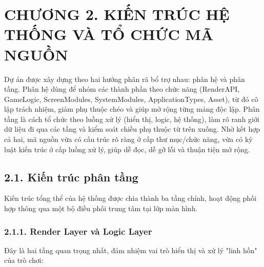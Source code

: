 \chapter*{\centering CHƯƠNG 2. KIẾN TRÚC HỆ THỐNG VÀ TỔ CHỨC MÃ NGUỒN}

\noindent \indent Dự án được xây dựng theo hai hướng phân rã bổ trợ nhau: phân hệ và phân tầng. Phân hệ dùng để nhóm các thành phần theo chức năng (RenderAPI, GameLogic, ScreenModules, SystemModules, ApplicationTypes, Asset), từ đó cô lập trách nhiệm, giảm phụ thuộc chéo và giúp mở rộng từng mảng độc lập. Phân tầng là cách tổ chức theo luồng xử lý (hiển thị, logic, hệ thống), làm rõ ranh giới dữ liệu đi qua các tầng và kiểm soát chiều phụ thuộc từ trên xuống. Nhờ kết hợp cả hai, mã nguồn vừa có cấu trúc rõ ràng ở cấp thư mục/chức năng, vừa có kỷ luật kiến trúc ở cấp luồng xử lý, giúp dễ đọc, dễ gỡ lỗi và thuận tiện mở rộng.

\section*{2.1. Kiến trúc phân tầng}

\noindent \indent Kiến trúc tổng thể của hệ thống được chia thành ba tầng chính, hoạt động phối hợp thông qua một bộ điều phối trung tâm tại lớp màn hình.

\subsection*{2.1.1. Render Layer và Logic Layer}

\noindent \indent Đây là hai tầng quan trọng nhất, đảm nhiệm vai trò hiển thị và xử lý "linh hồn" của trò chơi:

